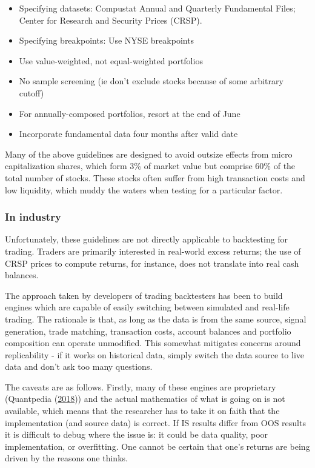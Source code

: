 \documentclass[11pt,preprint, authoryear]{elsarticle}
\numberwithin{equation}{section}
\numberwithin{figure}{section}
\numberwithin{table}{section}
\def\tightlist{} %
\begin{document}
\begin{itemize}
\tightlist
\item
  Specifying datasets: Compustat Annual and Quarterly Fundamental Files;
  Center for Research and Security Prices (CRSP).
\item
  Specifying breakpoints: Use NYSE breakpoints
\item
  Use value-weighted, not equal-weighted portfolios
\item
  No sample screening (ie don't exclude stocks because of some arbitrary
  cutoff)
\item
  For annually-composed portfolios, resort at the end of June
\item
  Incorporate fundamental data four months after valid date
\end{itemize}

Many of the above guidelines are designed to avoid outsize effects from
micro capitalization shares, which form 3\% of market value but comprise
60\% of the total number of stocks. These stocks often suffer from high
transaction costs and low liquidity, which muddy the waters when testing
for a particular factor.

\subsubsection{In industry}\label{in-industry}

Unfortunately, these guidelines are not directly applicable to
backtesting for trading. Traders are primarily interested in real-world
excess returns; the use of CRSP prices to compute returns, for instance,
does not translate into real cash balances.

The approach taken by developers of trading backtesters has been to
build engines which are capable of easily switching between simulated
and real-life trading. The rationale is that, as long as the data is
from the same source, signal generation, trade matching, transaction
costs, account balances and portfolio composition can operate
unmodified. This somewhat mitigates concerns around replicability - if
it works on historical data, simply switch the data source to live data
and don't ask too many questions.

The caveats are as follows. Firstly, many of these engines are
proprietary (Quantpedia (\protect\hyperlink{ref-Quantpedia2018}{2018}))
and the actual mathematics of what is going on is not available, which
means that the researcher has to take it on faith that the
implementation (and source data) is correct. If IS results differ from
OOS results it is difficult to debug where the issue is: it could be
data quality, poor implementation, or overfitting. One cannot be certain
that one's returns are being driven by the reasons one thinks.
\end{document}
